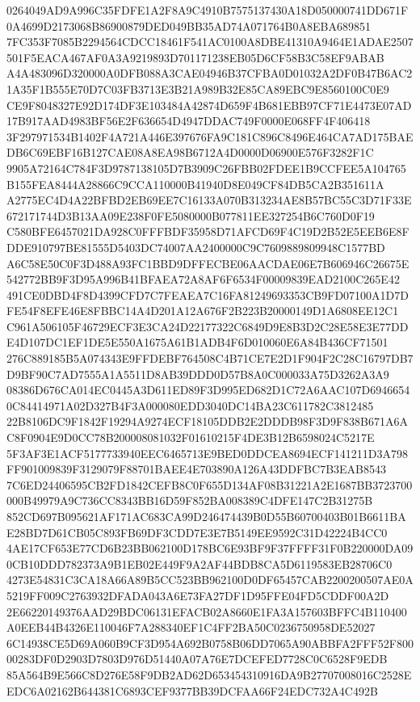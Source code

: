 \documentclass[UTF8,fontset=fandol,zihao=-4,a4paper]{ctexart}
\begin{document}
{{0264049AD9A996C35FDFE1A2F8A9C4910B7575137430A18D050000741DD671F0A4699D2173068B86900879DED049BB35AD74A071764B0A8EBA689851
7FC353F7085B2294564CDCC18461F541AC0100A8DBE41310A9464E1ADAE2507501F5EACA467AF0A3A9219893D701171238EB05D6CF58B3C58EF9ABAB
A4A483096D320000A0DFB088A3CAE04946B37CFBA0D01032A2DF0B47B6AC21A35F1B555E70D7C03FB3713E3B21A989B32E85CA89EBC9E8560100C0E9
CE9F8048327E92D174DF3E103484A42874D659F4B681EBB97CF71E4473E07AD17B917AAD4983BF56E2F636654D4947DDAC749F0000E068FF4F406418
3F297971534B1402F4A721A446E397676FA9C181C896C8496E464CA7AD175BAEDB6C69EBF16B127CAE08A8EA98B6712A4D0000D06900E576F3282F1C
9905A72164C784F3D9787138105D7B3909C26FBB02FDEE1B9CCFEE5A104765B155FEA8444A28866C9CCA110000B41940D8E049CF84DB5CA2B351611A
A2775EC4D4A22BFBD2EB69EE7C16133A070B313234AE8B57BC55C3D71F33E672171744D3B13AA09E238F0FE5080000B077811EE327254B6C760D0F19
C580BFE6457021DA928C0FFFBDF35958D71AFCD69F4C19D2B52E5EEB6E8FDDE910797BE81555D5403DC74007AA2400000C9C7609889809948C1577BD
A6C58E50C0F3D488A93FC1BBD9DFFECBE06AACDAE06E7B606946C26675E542772BB9F3D95A996B41BFAEA72A8AF6F6534F00009839EAD2100C265E42
491CE0DBD4F8D4399CFD7C7FEAEA7C16FA81249693353CB9FD07100A1D7DFE54F8EFE46E8FBBC14A4D201A12A676F2B223B20000149D1A6808EE12C1
C961A506105F46729ECF3E3CA24D22177322C6849D9E8B3D2C28E58E3E77DDE4D107DC1EF1DE5E550A1675A61B1ADB4F6D010060E6A84B436CF71501
276C889185B5A074343E9FFDEBF764508C4B71CE7E2D1F904F2C28C16797DB7D9BF90C7AD7555A1A5511D8AB39DDD0D57B8A0C000033A75D3262A3A9
08386D676CA014EC0445A3D611ED89F3D995ED682D1C72A6AAC107D69466540C84414971A02D327B4F3A000080EDD3040DC14BA23C611782C3812485
22B8106DC9F1842F19294A9274ECF18105DDB2E2DDDB98F3D9F838B671A6AC8F0904E9D0CC78B200008081032F01610215F4DE3B12B6598024C5217E
5F3AF3E1ACF5177733940EEC6465713E9BED0DDCEA8694ECF141211D3A798FF901009839F3129079F88701BAEE4E703890A126A43DDFBC7B3EAB8543
7C6ED24406595CB2FD1842CEFB8C0F655D134AF08B31221A2E1687BB3723700000B49979A9C736CC8343BB16D59F852BA008389C4DFE147C2B31275B
852CD697B095621AF171AC683CA99D246474439B0D55B60700403B01B6611BAE28BD7D61CB05C893FB69DF3CDD7E3E7B5149EE9592C31D42224B4CC0
4AE17CF653E77CD6B23BB062100D178BC6E93BF9F37FFFF31F0B220000DA090CB10DDD782373A9B1EB02E449F9A2AF44BDB8CA5D6119583EB28706C0
4273E54831C3CA18A66A89B5CC523BB962100D0DF65457CAB2200200507AE0A5219FF009C2763932DFADA043A6E73FA27DF1D95FFE04FD5CDDF00A2D
2E66220149376AAD29BDC06131EFACB02A8660E1FA3A157603BFFC4B110400A0EEB44B4326E110046F7A288340EF1C4FF2BA50C0236750958DE52027
6C14938CE5D69A060B9CF3D954A692B0758B06DD7065A90ABBFA2FFF52F80000283DF0D2903D7803D976D51440A07A76E7DCEFED7728C0C6528F9EDB
85A564B9E566C8D276E58F9DB2AD62D653454310916DA9B27707008016C2528EEDC6A02162B644381C6893CEF9377BB39DCFAA66F24EDC732A4C492B
}}
\end{document}
